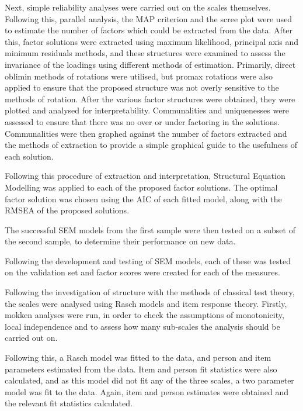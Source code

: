 Next, simple reliability analyses were carried out on the scales themselves. Following this, parallel analysis, the MAP criterion and the scree plot were used to estimate the number of factors which could be extracted from the data. After this, factor solutions were extracted using maximum likelihood, principal axis and minimum residuals methods, and these structures were examined to assess the invariance of the loadings using different methods of estimation. Primarily, direct oblimin methods of rotations were utilised, but promax rotations were also applied to ensure that the proposed structure was not overly sensitive to the methods of rotation. After the various factor structures were obtained, they were plotted and analysed for interpretability. Communalities and uniquenesses were assessed to ensure that there was no over or under factoring in the solutions. Communalities were then graphed against the number of factors extracted and the methods of extraction to provide a simple graphical guide to the usefulness of each solution.

Following this procedure of extraction and interpretation, Structural Equation Modelling was applied to each of the proposed factor solutions. The optimal factor solution was chosen using the AIC of each fitted model, along with the RMSEA of the proposed solutions.

The successful SEM models from the first sample were then tested on a subset of the second sample, to determine their performance on new data. 

Following the development and testing of SEM models, each of these was tested on the validation set and factor scores were created for each of the measures.

Following the investigation of structure with the methods of classical test theory, the scales were analysed using Rasch models and item response theory. Firstly, mokken analyses were run, in order to check the assumptions of monotonicity, local independence and to assess how many sub-scales the analysis should be carried out on. 

Following this, a Rasch model was fitted to the data, and person and item parameters estimated from the data. Item and person fit statistics were also calculated, and as this model did not fit any of the three scales, a two parameter model was fit to the data. Again, item and person estimates were obtained and the relevant fit statistics calculated. %


